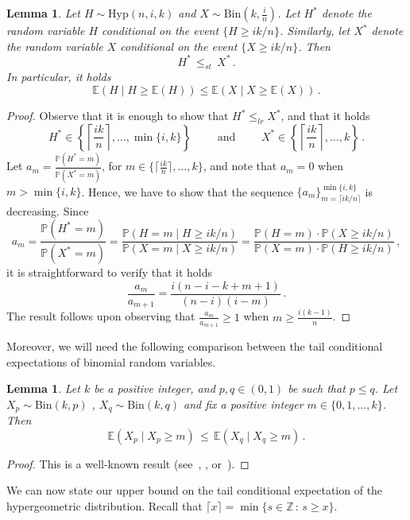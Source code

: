\documentclass[10pt]{article}
\theoremstyle{plain}
\newtheorem{lemma}[theorem]{Lemma}
\theoremstyle{definition}
\theoremstyle{remark}
\newcommand{\Prb}{\mathbb{P}}
\newcommand{\Exp}{\mathbb{E}}
\begin{document}
\begin{lemma}\label{tce_conj}
Let $H\sim\text{Hyp}(n,i,k)$ and $X\sim\text{Bin}(k, \frac{i}{n})$.
Let $H^{\ast}$ denote the  random variable $H$ conditional on the event $\{H\ge ik/n\}$. Similarly, let 
$X^{\ast}$ denote the  random variable $X$ conditional on the event $\{X\ge ik/n\}$.
Then   
\[
H^{\ast}\, \le_{st} \, X^{\ast} \, .
\]
In particular, it holds 
\[
\Exp(H\mid H\ge \Exp(H)) \le \Exp(X\mid X\ge \Exp(X) ) \, .
\]
\end{lemma}
\begin{proof}
Observe that it is enough to show that $H^{\ast} \le_{lr}  X^{\ast}$, and  that it holds 
\[
H^{\ast} \in \left\{\left\lceil\frac{ik}{n} \right\rceil,\ldots, \min\{i,k\}\right\} 
\quad\quad\text{ and }\quad\quad X^{\ast} \in \left\{\left\lceil\frac{ik}{n} \right\rceil,\ldots, k\right\} \, .
\]
Let $a_m = \frac{\Prb\left(H^{\ast}=m \right)}{\Prb\left(X^{\ast}=m\right)}$, for $m\in  \{\lceil\frac{ik}{n} \rceil,\ldots,k\}$, and note that $a_m=0$ when $m > \min\{i,k\}$. Hence, we have  to show that the sequence $\{a_m\}_{m=\lceil ik/n\rceil}^{\min\{i,k\}}$ is decreasing.  
Since 
\[
a_m = \frac{\Prb\left(H^{\ast}=m \right)}{\Prb\left(X^{\ast}=m\right)} = \frac{\Prb(H=m\mid H\ge ik/n)}{\Prb(X=m\mid X\ge ik/n)} = \frac{\Prb(H=m)\cdot \Prb(X\ge ik/n)}{\Prb(X=m)\cdot \Prb(H\ge ik/n)} \, ,
\]
it is straightforward to verify that it holds   
\[
\frac{a_m}{a_{m+1}} = \frac{i(n-i-k+m+1)}{(n-i)(i-m)} \, .
\]
The result follows upon observing that $\frac{a_m}{a_{m+1}}\ge 1$ when $m\ge \frac{i(k-1)}{n}$. 
\end{proof}

Moreover, we will need the following comparison between the tail conditional expectations of binomial random variables. 


\begin{lemma}\label{tce_binomial}
Let $k$ be a positive integer, and $p,q\in (0,1)$ be such that $p\le q$. Let $X_p\sim\text{Bin}(k,p)$ ,   $X_q\sim\text{Bin}(k,q)$ 
and fix a positive integer $m\in \{0,1,\ldots,k\}$. Then 
\[
\Exp(X_p\mid X_p \ge m) \,\le\, \Exp(X_q\mid X_q \ge m) \, .
\]
\end{lemma}
\begin{proof} 
This is a well-known result (see~\cite{Broman_Brug_Kager_Meester}, \cite{Klenke_Mattner}, or~\cite[Lemma~2.4]{Pelekis_Ramon}). 
\end{proof}

We can now state our upper bound on the tail conditional expectation of the hypergeometric distribution. Recall that $\lceil x \rceil=\min\{s\in\mathbb{Z}\,:\, s\ge x\}$. 
\end{document}
